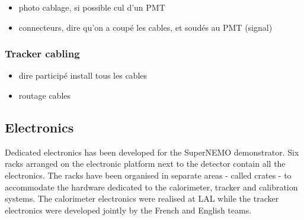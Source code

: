 \begin{itemize}
\item photo cablage, si possible cul d'un PMT
\item connecteurs, dire qu'on a coupé les cables, et soudés au PMT (signal)
\end{itemize}

\subsubsection*{Tracker cabling}

\begin{itemize}
\item dire participé install tous les cables
\item routage cables
\end{itemize}


\subsection{Electronics}

Dedicated electronics has been developed for the SuperNEMO demonstrator.
Six racks arranged on the electronic platform next to the detector contain all the electronics.
The racks have been organised in separate areas - called crates - to accommodate the hardware dedicated to the calorimeter, tracker and calibration systems.
The calorimeter electronics were realised at LAL while the tracker electronics were developed jointly by the French and English teams.

